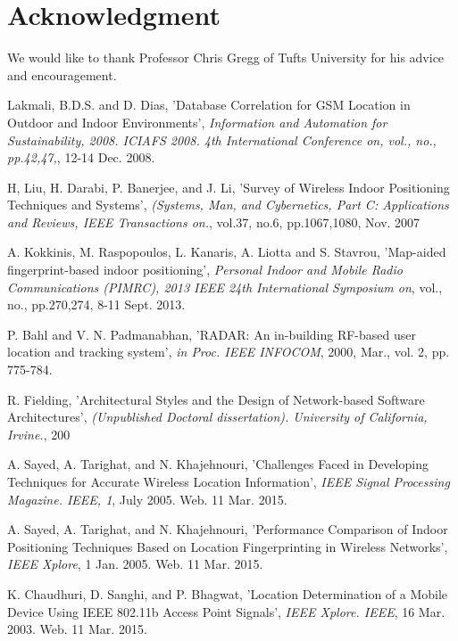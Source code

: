 \documentclass[conference]{IEEEtran}
\begin{document}
\section*{Acknowledgment}
We would like to thank Professor Chris Gregg of Tufts University for his advice and encouragement.



\begin{thebibliography}{99}


 Lakmali, B.D.S. and D. Dias,
'Database Correlation for GSM Location in Outdoor and Indoor Environments',
\emph{Information and Automation for Sustainability, 2008. ICIAFS 2008. 4th International Conference on, vol., no., pp.42,47,}, 12-14 Dec. 2008.

 H, Liu, H. Darabi, P. Banerjee, and J. Li,
'Survey of Wireless Indoor Positioning Techniques and Systems',
\emph{ (Systems, Man, and Cybernetics, Part C: Applications and Reviews, IEEE Transactions on.}, vol.37, no.6, pp.1067,1080, Nov. 2007 

 A. Kokkinis, M. Raspopoulos, L. Kanaris, A. Liotta and S. Stavrou,
'Map-aided fingerprint-based indoor positioning',
\emph{Personal Indoor and Mobile Radio Communications (PIMRC), 2013 IEEE 24th International Symposium on}, vol., no., pp.270,274, 8-11 Sept. 2013.

 P. Bahl and V. N. Padmanabhan,
'RADAR: An in-building RF-based user location and tracking system',
\emph{in Proc. IEEE INFOCOM}, 2000, Mar., vol. 2, pp. 775-784.

 R. Fielding,
'Architectural Styles and the Design of Network-based Software Architectures',
\emph{ (Unpublished Doctoral dissertation). University of California, Irvine.}, 200

  A. Sayed, A. Tarighat, and N. Khajehnouri,
'Challenges Faced in Developing Techniques for Accurate Wireless Location Information',
\emph{IEEE Signal Processing Magazine. IEEE, 1}, July 2005. Web. 11 Mar. 2015.
 
 A. Sayed, A. Tarighat, and N. Khajehnouri,
'Performance Comparison of Indoor Positioning Techniques Based on Location Fingerprinting in Wireless Networks',
\emph{IEEE Xplore}, 1 Jan. 2005. Web. 11 Mar. 2015. 
 
 K. Chaudhuri, D. Sanghi, and P. Bhagwat,
'Location Determination of a Mobile Device Using IEEE 802.11b Access Point Signals',
\emph{IEEE Xplore. IEEE}, 16 Mar. 2003. Web. 11 Mar. 2015.
 

\end{thebibliography}
\end{document}

